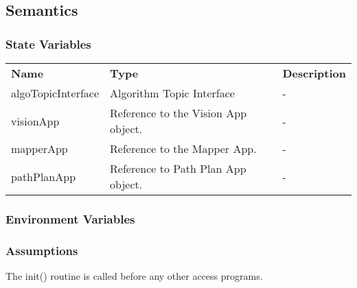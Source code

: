 \documentclass[12pt, titlepage]{article}
\begin{document}
\subsection{Semantics}
\subsubsection{State Variables}
\begin{center}
\begin{tabular}{p{3 cm} p{4cm} p{5cm} }
\hline
\textbf{Name} & \textbf{Type} & \textbf{Description}  \\
algoTopicInterface & Algorithm Topic Interface & - \\
visionApp & Reference to the Vision App object. & - \\
mapperApp & Reference to the Mapper App. & - \\
pathPlanApp & Reference to Path Plan App object. & - \\
\hline
\hline
\end{tabular}
\end{center}
\subsubsection{Environment Variables}
\subsubsection{Assumptions}
The init() routine is called before any other access programs.
\end{document}
